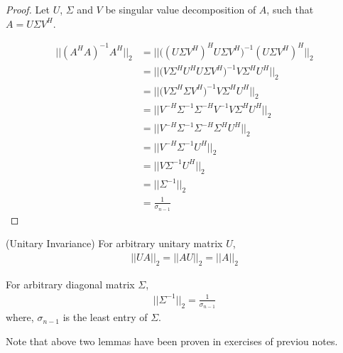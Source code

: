 \documentclass[11pt,a4paper]{article}
\begin{document}
\begin{proof}
    Let $U$, $\Sigma$ and $V$ be singular value decomposition of $A$, such
    that $A = U\Sigma V^H$.

    \begin{align}
         || (A^H A)^{-1} A^H ||_2 
        &= || \big( (U\Sigma V^H)^H U\Sigma V^H \big)^{-1} (U\Sigma V^H)^H ||_2 \\
        &= || \big( V \Sigma^H U^H U\Sigma V^H \big)^{-1} V \Sigma^H U^H ||_2 \\
        &= || \big( V \Sigma^H \Sigma V^H \big)^{-1} V \Sigma^H U^H ||_2 \\
        &= || V^{-H} \Sigma^{-1} \Sigma^{-H} V^{-1}  V \Sigma^H U^H ||_2 \\
        &= || V^{-H} \Sigma^{-1} \Sigma^{-H} \Sigma^H U^H ||_2 \\
        &= || V^{-H} \Sigma^{-1} U^H ||_2 \\
        &= || V \Sigma^{-1} U^H ||_2 \\
        &= || \Sigma^{-1}||_2 \\
        &= \frac{1}{\sigma_{n-1}}
    \end{align}
\end{proof}

\begin{lemma}
    (Unitary Invariance) For arbitrary unitary matrix $U$, 
    \begin{align}
        || U A ||_2 = || A U ||_2 = || A ||_2 
    \end{align}
\end{lemma}

\begin{lemma}
    For arbitrary diagonal matrix $\Sigma$, 
    \begin{align}
        || \Sigma^{-1} ||_2 = \frac{1}{\sigma_{n-1}}
    \end{align}
    where, $\sigma_{n-1}$ is the least entry of $\Sigma$. 
\end{lemma}
Note that above two lemmas have been proven in exercises of previou notes.

\newpage
\end{document}
